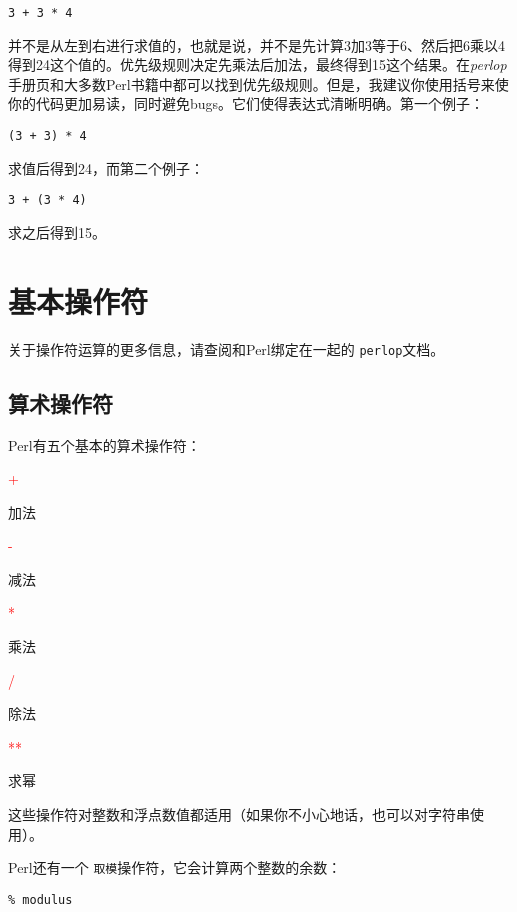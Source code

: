 \begin{lstlisting}
3 + 3 * 4
\end{lstlisting}

并不是从左到右进行求值的，也就是说，并不是先计算3加3等于6、然后把6乘以4得到24这个值的。优先级规则决定先乘法后加法，最终得到15这个结果。在\textit{perlop}手册页和大多数Perl书籍中都可以找到优先级规则。但是，我建议你使用括号来使你的代码更加易读，同时避免bugs。它们使得表达式清晰明确。第一个例子：

\begin{lstlisting}
(3 + 3) * 4
\end{lstlisting}

求值后得到24，而第二个例子：

\begin{lstlisting}
3 + (3 * 4)
\end{lstlisting}

求之后得到15。

\section{基本操作符}
关于操作符运算的更多信息，请查阅和Perl绑定在一起的 \verb|perlop|文档。

\subsection{算术操作符}
Perl有五个基本的算术操作符：

\noindent
\textcolor{red}{+}
\begin{adjustwidth}{4em}{}
加法
\end{adjustwidth}
\textcolor{red}{-}
\begin{adjustwidth}{4em}{}
减法
\end{adjustwidth}
\textcolor{red}{*}
\begin{adjustwidth}{4em}{}
乘法
\end{adjustwidth}
\textcolor{red}{/}
\begin{adjustwidth}{4em}{}
除法
\end{adjustwidth}
\textcolor{red}{**}
\begin{adjustwidth}{4em}{}
求幂
\end{adjustwidth}

这些操作符对整数和浮点数值都适用（如果你不小心地话，也可以对字符串使用）。

Perl还有一个 \verb|取模|操作符，它会计算两个整数的余数：

\begin{lstlisting}
% modulus
\end{lstlisting}

